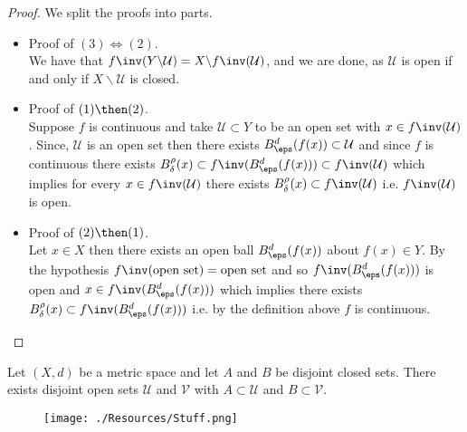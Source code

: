 \documentclass[12pt, a4paper]{article}
\newcommand{\UU}{\mathcal U}
\begin{document}
\begin{proof}
    We split the proofs into parts.
    \begin{itemize}
        \item Proof of \((3) \iff (2)\). \\
        We have that \(f\inv(Y \backslash \UU) = X \backslash f\inv(\UU)\), and we are done, as \(\UU\) is open if and only if \(X \backslash \UU\) is closed.
        \item Proof of \((1) \then (2)\). \\
        Suppose \(f\) is continuous and take \(\mathcal{U} \subset Y\) to be an open set with \(x \in f\inv(\mathcal{U})\). Since, \(\mathcal{U}\) is an open set then there exists \(B_{\eps}^d(f(x)) \subset \UU\) and since \(f\) is continuous there exists \(B_{\delta}^{\rho}(x)\subset f\inv(B_{\eps}^d (f(x))) \subset f\inv(\UU)\) which implies for every \(x \in f\inv(\mathcal{U})\) there exists \(B_{\delta}^{\rho}(x) \subset f\inv(\UU)\) i.e. \(f\inv(\UU)\) is open.
        \item Proof of \((2) \then (1)\). \\
        Let \(x \in X\) then there exists an open ball \(B_{\eps}^d(f(x))\) about \(f(x) \in Y\). By the hypothesis \(f\inv(\text{open set}) = \text{open set}\) and so \(f\inv(B_{\eps}^d(f(x)))\) is open and \(x \in f\inv(B_{\eps}^d(f(x)))\) which implies there exists \(B_{\delta}^{\rho}(x) \subset f\inv(B_{\eps}^d(f(x)))\) i.e. by the definition above \(f\) is continuous.
    \end{itemize}
\end{proof}

\begin{theorem}
    Let \((X,d)\) be a metric space and let \(A\) and \(B\) be disjoint closed sets. There exists disjoint open sets \(\mathcal{U}\) and \(\mathcal{V}\) with \(A \subset \mathcal{U}\) and \(B \subset \mathcal{V}\).
\end{theorem}

\begin{mdnote}
\begin{figure}[H]
     \begin{center}
         \texttt{[image: ./Resources/Stuff.png]}
     \end{center}
\end{figure}
\end{mdnote}
\end{document}
